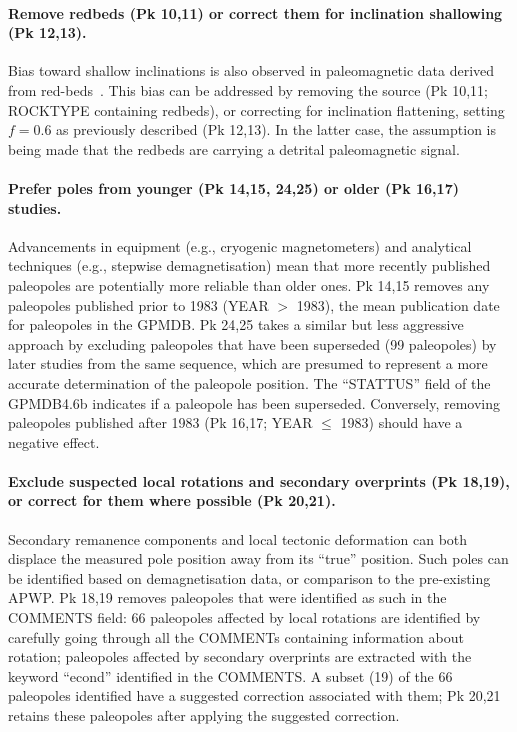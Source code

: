 \paragraph{Remove redbeds (Pk 10,11) or correct them for inclination
shallowing (Pk 12,13).} Bias toward shallow inclinations is also observed
in paleomagnetic data derived from red-beds~\cite[e.g., in central Asia,
Mediterranean region, North America, etc.]{T04,K04,T07,B10}. This bias can be
addressed by removing the source (Pk 10,11; ROCKTYPE containing redbeds), or
correcting for inclination flattening, setting $f=0.6$ as previously described
(Pk 12,13). In the latter case, the assumption is being made that the
redbeds are carrying a detrital paleomagnetic signal.

\paragraph{Prefer poles from younger (Pk 14,15, 24,25) or older (Pk 16,17)
studies.} Advancements in equipment (e.g., cryogenic magnetometers) and
analytical techniques (e.g., stepwise demagnetisation) mean that more recently
published paleopoles are potentially more reliable than older ones. Pk 14,15
removes any paleopoles published prior to 1983 (YEAR $>$ 1983), the mean
publication date for paleopoles in the GPMDB\@. Pk 24,25 takes a similar but
less aggressive approach by excluding paleopoles that have been superseded (99
paleopoles) by later studies from the same sequence, which are presumed to
represent a more accurate determination of the paleopole position. The
``STATTUS'' field of the GPMDB4.6b indicates if a paleopole has been superseded.
Conversely, removing paleopoles published after 1983 (Pk 16,17; YEAR $\leq$
1983) should have a negative effect.

\paragraph{Exclude suspected local rotations and secondary overprints (Pk
18,19), or correct for them where possible (Pk 20,21).} Secondary remanence
components and local tectonic deformation can both displace the measured pole
position away from its ``true'' position. Such poles can be identified based on
demagnetisation data, or comparison to the pre-existing APWP\@. Pk 18,19
removes paleopoles that were identified as such in the COMMENTS field: 66
paleopoles affected by local rotations are identified by carefully going through
all the COMMENTs containing information about rotation; paleopoles affected by
secondary overprints are extracted with the keyword ``econd'' identified in the
COMMENTS\@. A subset (19) of the 66 paleopoles identified have a suggested
correction associated with them; Pk 20,21 retains these paleopoles after
applying the suggested correction.

